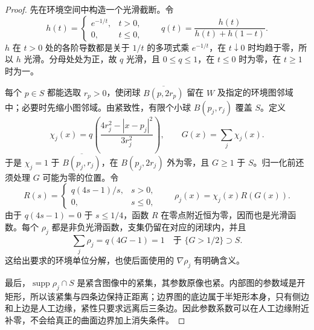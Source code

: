 \begin{proof}
先在环境空间中构造一个光滑截断。令
\[
 h(t)=\begin{cases}e^{-1/t},&t>0,\\0,&t\leq0,\end{cases}
 \qquad q(t)=\frac{h(t)}{h(t)+h(1-t)}.
\]
\(h\) 在 \(t>0\) 处的各阶导数都是关于 \(1/t\) 的多项式乘 \(e^{-1/t}\)，在 \(t\downarrow0\) 时均趋于零，所以 \(h\) 光滑。分母处处为正，故 \(q\) 光滑，且 \(0\leq q\leq1\)，在 \(t\leq0\) 时为零，在 \(t\geq1\) 时为一。

每个 \(p\in S\) 都能选取 \(r_p>0\)，使闭球 \(\overline{B(p,2r_p)}\) 留在 \(W\) 及指定的环境图邻域中；必要时先缩小图邻域。由紧致性，有限个小球 \(B(p_j,r_j)\) 覆盖 \(S\)。定义
\[
 \chi_j(x)=q\left(\frac{4r_j^2-|x-p_j|^2}{3r_j^2}\right),
 \qquad G(x)=\sum_j\chi_j(x).
\]
于是 \(\chi_j=1\) 于 \(\overline{B(p_j,r_j)}\)，在 \(B(p_j,2r_j)\) 外为零，且 \(G\geq1\) 于 \(S\)。归一化前还须处理 \(G\) 可能为零的位置。令
\[
 R(s)=\begin{cases}q(4s-1)/s,&s>0,\\0,&s\leq0,\end{cases}
 \qquad \rho_j(x)=\chi_j(x)R(G(x)).
\]
由于 \(q(4s-1)=0\) 于 \(s\leq1/4\)，函数 \(R\) 在零点附近恒为零，因而也是光滑函数。每个 \(\rho_j\) 都是非负光滑函数，支集仍留在对应的闭球内，并且
\[
 \sum_j\rho_j=q(4G-1)=1\quad\text{于 }\{G>1/2\}\supset S.
\]
这给出要求的环境单位分解，也使后面使用的 \(\nabla\rho_j\) 有明确含义。

最后，\(\operatorname{supp}\rho_j\cap S\) 是紧含图像中的紧集，其参数原像也紧。内部图的参数域是开矩形，所以该紧集与四条边保持正距离；边界图的底边属于半矩形本身，只有侧边和上边是人工边缘，紧性只要求远离后三条边。因此参数系数可以在人工边缘附近补零，不会给真正的曲面边界加上消失条件。
\end{proof}

